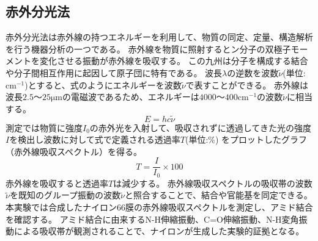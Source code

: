 \documentclass[11pt]{jsarticle}
\begin{document}
\subsection{赤外分光法}
赤外分光法は赤外線の持つエネルギーを利用して、物質の同定、定量、構造解析を行う機器分析の一つである。
赤外線を物質に照射するとン分子の双極子モーメントを変化させる振動が赤外線を吸収する。
この九州は分子を構成する結合や分子間相互作用に起因して原子団に特有である。
波長$\lambda$の逆数を波数$\tilde{\nu}$(単位:$\mathrm{cm^{-1}}$)とすると、式のようにエネルギーを波数$\tilde{\nu}$で表すことができる。
赤外線は波長$2.5～25 \mathrm{\mu m}$の電磁波であるため、エネルギーは$4000～400 \mathrm{cm^{-1}}$の波数$\tilde{\nu}$に相当する。
\begin{equation}
    E=hc\tilde{\nu}
\end{equation}
測定では物質に強度$I_0$の赤外光を入射して、吸収されずに透過してきた光の強度$I$を検出し波数に対して式で定義される透過率$T$(単位:$\mathrm{\%}$)
をプロットしたグラフ（赤外線吸収スペクトル）を得る。
\begin{equation}
    T=\frac{I}{I_0} \times 100
\end{equation}
赤外線を吸収すると透過率$T$は減少する。
赤外線吸収スペクトルの吸収帯の波数$\tilde{\nu}$を既知のグループ振動の波数$\tilde{\nu}$と照合することで、結合や官能基を同定できる。
本実験では合成したナイロン66膜の赤外線吸収スペクトルを測定し、アミド結合を確認する。
アミド結合に由来するN-H伸縮振動、C=O伸縮振動、N-H変角振動による吸収帯が観測されることで、ナイロンが生成した実験的証拠となる。
\end{document}
